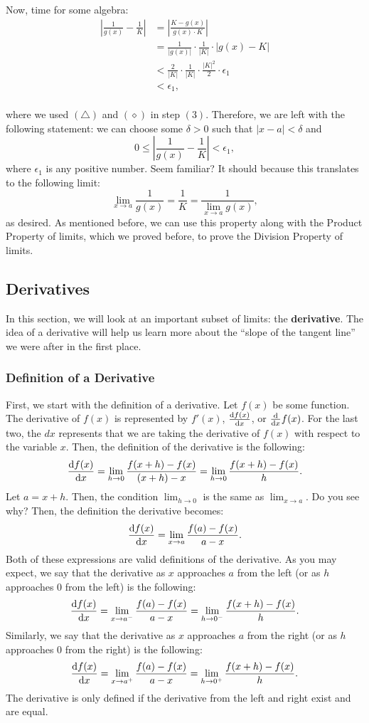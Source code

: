 \documentclass{article}
\begin{document}
\\
\\
Now, time for some algebra:
\begin{align*}
    \left|\frac{1}{g(x)}-\frac{1}{K}\right|&=\left|\frac{K-g(x)}{g(x)\cdot K}\right|\\
    &= \frac{1}{|g(x)|}\cdot \frac{1}{|K|}\cdot \left|g(x)-K\right|\\
    &< \frac{2}{|K|}\cdot \frac{1}{|K|}\cdot \frac{|K|^2}{2}\cdot \epsilon_1\tag{3}\\
    &< \epsilon_1,
\end{align*}
\\
where we used $(\triangle)$ and $(\diamond)$ in step $(3)$. Therefore, we are left with the following statement: we can choose some $\delta>0$ such that $|x-a|<\delta$ and 
\[0\leq \left|\frac{1}{g(x)}-\frac{1}{K}\right|< \epsilon_1,\]
where $\epsilon_1$ is any positive number. Seem familiar? It should because this translates to the following limit:
\[\lim_{x\to a} \frac{1}{g(x)} = \frac{1}{K}=\frac{1}{\lim_{x\to a} g(x)},\]
as desired. As mentioned before, we can use this property along with the Product Property of limits, which we proved before, to prove the Division Property of limits. 
$\boxed{}$

\subsection{Derivatives}
In this section, we will look at an important subset of limits: the \textbf{derivative}. The idea of a derivative will help us learn more about the ``slope of the tangent line'' we were after in the first place. 

\subsubsection{Definition of a Derivative}
First, we start with the definition of a derivative. Let $f(x)$ be some function. The derivative of $f(x)$ is represented by $f'(x)$, $\diff{f(x)}{x}$, or $\diff{}{x}f(x)$. For the last two, the $dx$ represents that we are taking the derivative of $f(x)$ with respect to the variable $x$. Then, the definition of the derivative is the following:
\[\diff{f(x)}{x}=\lim_{h\to 0}\frac{f(x+h)-f(x)}{(x+h)-x}=\lim_{h\to 0}\frac{f(x+h)-f(x)}{h}.\]
Let $a=x+h$. Then, the condition $\lim_{h\to 0}$ is the same as $\lim_{x\to a}$. Do you see why? Then, the definition the derivative becomes:
\[\diff{f(x)}{x}=\lim_{x\to a}\frac{f(a)-f(x)}{a-x}.\]
Both of these expressions are valid definitions of the derivative. As you may expect, we say that the derivative as $x$ approaches $a$ from the left (or as $h$ approaches 0 from the left) is the following:
\[\diff{f(x)}{x}=\lim_{x\to a^-}\frac{f(a)-f(x)}{a-x}=\lim_{h\to 0^-}\frac{f(x+h)-f(x)}{h}.\]
Similarly, we say that the derivative as $x$ approaches $a$ from the right (or as $h$ approaches 0 from the right) is the following:
\[\diff{f(x)}{x}=\lim_{x\to a^+}\frac{f(a)-f(x)}{a-x}=\lim_{h\to 0^+}\frac{f(x+h)-f(x)}{h}.\]
The derivative is only defined if the derivative from the left and right exist and are equal. 
\end{document}
